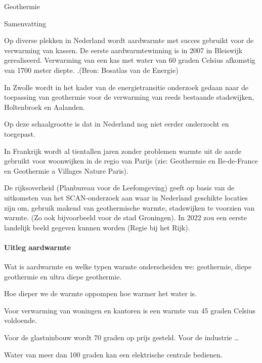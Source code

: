 \begin{voorstel}{Geothermie}

\begin{samenvatting}
Samenvatting
\end{samenvatting}

\begin{uitdaging}
Op diverse plekken in Nederland wordt aardwarmte met succes gebruikt voor de verwarming van kassen. De eerste aardwarmtewinning is in 2007 in Bleiswijk gerealiseerd. Verwarming van een kas met water van 60 graden Celsius afkomstig van 1700 meter diepte. .(Bron: Bosatlas van de Energie)

In Zwolle wordt in het kader van de energietransitie onderzoek gedaan naar de toepassing van geothermie voor de verwarming van reeds bestaande stadswijken, Holtenbroek en Aalanden.

Op deze schaalgrootte is dat in Nederland nog niet eerder onderzocht en toegepast.

In Frankrijk wordt al tientallen jaren zonder problemen warmte uit de aarde gebruikt voor woonwijken in de regio van  Parijs (zie: Geothermie en Ile-de-France en Geothermie a Villages Nature Paris).

De rijksoverheid (Planbureau voor de Leefomgeving) geeft op basis van de uitkomsten van het SCAN-onderzoek aan waar in Nederland geschikte locaties zijn om, gebruik makend van geothermische warmte, stadswijken te voorzien van warmte. (Zo ook bijvoorbeeld voor de stad Groningen). In 2022 zou een eerste landelijk beeld gegeven kunnen worden (Regie bij het Rijk).
\end{uitdaging}

\begin{overwegingen}
\paragraph{Uitleg aardwarmte}
Wat is aardwarmte en welke typen warmte onderscheiden we: geothermie, diepe geothermie en ultra diepe geothermie. 

Hoe dieper we de warmte oppompen hoe warmer het water is.

Voor verwarming van woningen en kantoren is een warmte van 45 graden Celsius voldoende.

Voor de glastuinbouw wordt 70 graden op prijs gesteld. 
Voor de industrie …

Water van meer dan 100 graden kan een elektrische centrale bedienen.


\end{overwegingen}
\end{voorstel}
